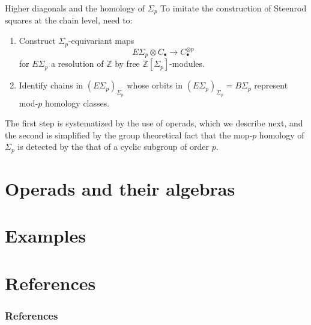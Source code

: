 \documentclass[10pt,t]{beamer}
\begin{document}
\begin{frame}{Higher diagonals and the homology of $\Sigma_p$}
	To imitate the construction of Steenrod squares at the chain level, need to:
	\begin{enumerate}
		\item Construct $\Sigma_p$-equivariant maps
		\begin{equation*}
		E\Sigma_p \otimes C_\bullet \to C_\bullet^{\otimes p}
		\end{equation*}
		for $E\Sigma_p$ a resolution of $\mathbb Z$ by free $\mathbb Z[\Sigma_p]$-modules.
		\vspace*{10pt}
		\item Identify chains in $(E\Sigma_p)_{\Sigma_p}$ whose orbits in $(E\Sigma_p)_{\Sigma_p} = B\Sigma_p$ represent mod-$p$ homology classes.
	\end{enumerate}
	\vspace*{10pt}
	The first step is systematized by the use of operads, which we describe next, and the second is simplified by the group theoretical fact that the mop-$p$ homology of $\Sigma_p$ is detected by the that of a cyclic subgroup of order $p$.
\end{frame}


\section{Operads and their algebras}

\section{Examples}

\section*{References}

\begin{frame}%
	\frametitle{References}
	\nocite{whitney1935history}
	
	
\end{frame}
\end{document}
